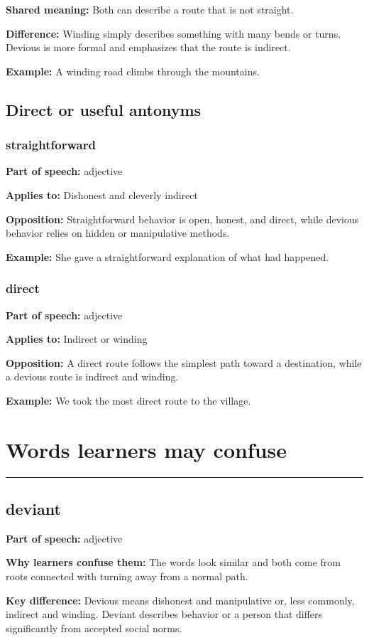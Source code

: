 \documentclass[11pt]{article}
\newcommand{\sectionrule}{\par\vspace{-0.5em}\noindent\textcolor{Accent}{\rule{\linewidth}{0.6pt}}\par}
\begin{document}
\textbf{Shared meaning:} Both can describe a route that is not straight.

\textbf{Difference:} Winding simply describes something with many bends or turns. Devious is more formal and emphasizes that the route is indirect.

\textbf{Example:} A winding road climbs through the mountains.

\subsection{Direct or useful antonyms}
\subsubsection{straightforward}
\textbf{Part of speech:} adjective

\textbf{Applies to:} Dishonest and cleverly indirect

\textbf{Opposition:} Straightforward behavior is open, honest, and direct, while devious behavior relies on hidden or manipulative methods.

\textbf{Example:} She gave a straightforward explanation of what had happened.

\subsubsection{direct}
\textbf{Part of speech:} adjective

\textbf{Applies to:} Indirect or winding

\textbf{Opposition:} A direct route follows the simplest path toward a destination, while a devious route is indirect and winding.

\textbf{Example:} We took the most direct route to the village.

\section{Words learners may confuse}
\sectionrule
\subsection{deviant}
\textbf{Part of speech:} adjective

\textbf{Why learners confuse them:} The words look similar and both come from roots connected with turning away from a normal path.

\textbf{Key difference:} Devious means dishonest and manipulative or, less commonly, indirect and winding. Deviant describes behavior or a person that differs significantly from accepted social norms.
\end{document}
